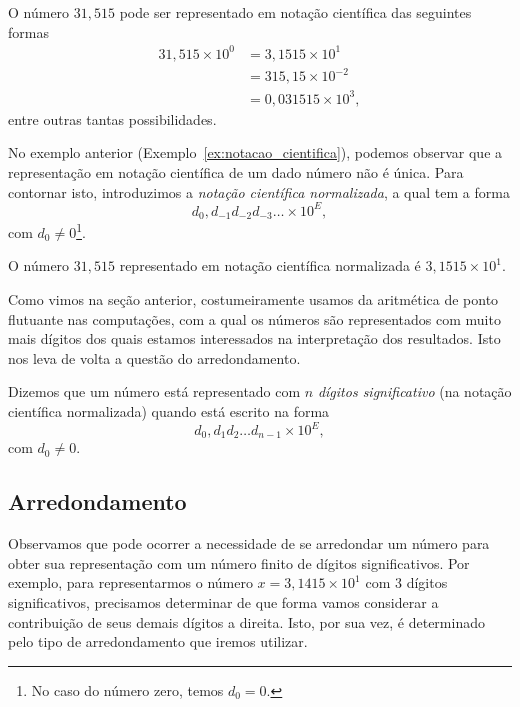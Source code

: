\begin{ex}\label{ex:notacao_cientifica}
  O número $31,515$ pode ser representado em notação científica das seguintes formas
  \begin{align}
    31,515\times 10^0 &= 3,1515\times 10^{1} \\
                      &= 315,15\times 10^{-2} \\
                      &= 0,031515\times 10^{3},
  \end{align}
entre outras tantas possibilidades.
\end{ex}

No exemplo anterior (Exemplo~\ref{ex:notacao_cientifica}), podemos observar que a representação em notação científica de um dado número não é única. Para contornar isto, introduzimos a \emph{notação científica normalizada}, a qual tem a forma
\begin{equation}
  d_0,d_{-1}d_{-2}d_{-3}\ldots\times 10^{E},
\end{equation}
com $d_0 \neq 0$\footnote{No caso do número zero, temos $d_0=0$.}.

\begin{ex}
  O número $31,515$ representado em notação científica normalizada é $3,1515\times 10^{1}$.
\end{ex}

Como vimos na seção anterior, costumeiramente usamos da aritmética de ponto flutuante nas computações, com a qual os números são representados com muito mais dígitos dos quais estamos interessados na interpretação dos resultados. Isto nos leva de volta a questão do arredondamento.

Dizemos que um número está representado com $n$ \emph{dígitos significativo} (na notação científica normalizada) quando está escrito na forma
\begin{equation}
  d_0,d_{1}d_{2}\ldots d_{n-1}\times 10^{E},
\end{equation}
com $d_0\neq 0$. 

\subsection{Arredondamento}

Observamos que pode ocorrer a necessidade de se arredondar um número para obter sua representação com um número finito de dígitos significativos. Por exemplo, para representarmos o número $x=3,1415\times 10^1$ com 3 dígitos significativos, precisamos determinar de que forma vamos considerar a contribuição de seus demais dígitos a direita. Isto, por sua vez, é determinado pelo tipo de arredondamento que iremos utilizar.

